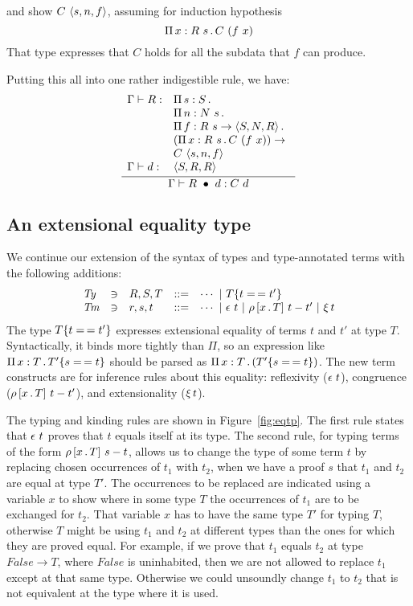 \documentclass{article}
\begin{document}
\noindent and show $C\ \ctor{s}{n}{f}$, assuming for induction hypothesis
\[
\Pia{x}{R\ s}{C\ (f\ x)}
\]
\noindent That type expresses that $C$ holds for all the subdata that $f$ can produce.

Putting this all into one rather indigestible rule, we have:
\[
\infer{\Gamma \vdash \wrec{R}{d} : C\ d}
      {
        \begin{array}{lll}
\Gamma \vdash R : & \Pia{s}{S}{\ }  \\
\ &  \Pia{n}{N\ s}{\ }  \\
\ &  \Pia{f}{R\ s \to \w{S}{N}{R}}{\ }  \\
\ &  (\Pia{x}{R\ s}{C\ (f\ x)}) \to  \\
\ &  C\ \ctor{s}{n}{f} \\
\Gamma\vdash d : & \w{S}{R}{R}
        \end{array} }
      \]



\subsection{An extensional equality type}

We continue our extension of the syntax of types and type-annotated terms with the following additions:
\[
\begin{array}{lllll}
  \textit{Ty} & \ni & R,S,T & ::= & \cdots\ |\ \eqtm{t}{T}{t'} \\
  \textit{Tm} & \ni & r,s,t & ::= & \cdots\ |\ \rfl{t}\ |\ \cng{x}{T}{t}{t'}\ |\ \ext{t}
\end{array}
\]
\noindent The type $\eqtm{t}{T}{t'}$ expresses extensional equality of
terms $t$ and $t'$ at type $T$.  Syntactically, it binds more tightly
than $\Pi$, so an expression like $\Pia{x}{T}{\eqtm{s}{T'}{t}}$ should
be parsed as $\Pia{x}{T}{(\eqtm{s}{T'}{t})}$.  The new term constructs
are for inference rules about this equality: reflexivity ($\rfl{t}$),
congruence ($\cng{x}{T}{t}{t'}$), and extensionality ($\ext{t}$).  

The typing and kinding rules are shown in
Figure~\ref{fig:eqtp}.  The first rule states that $\rfl{t}$ proves
that $t$ equals itself at its type.  The second rule, for typing
terms of the form $\cng{x}{T}{s}{t}$, allows us
to change the type of some term $t$ by replacing chosen occurrences
of $t_1$ with $t_2$, when we have a proof $s$ that $t_1$ and $t_2$
are equal at type $T'$.  The occurrences to be replaced are indicated
using a variable $x$ to show where in some type $T$ the occurrences
of $t_1$ are to be exchanged for $t_2$.  That variable $x$ has to
have the same type $T'$ for typing $T$, otherwise $T$ might be using
$t_1$ and $t_2$ at different types than the ones for which they are
proved equal.  For example, if we prove that $t_1$ equals $t_2$ at type
$\textit{False} \to T$, where $\textit{False}$ is uninhabited, then
we are not allowed to replace $t_1$ except at that same type.  Otherwise
we could unsoundly change $t_1$ to $t_2$ that is not equivalent at the
type where it is used.
\end{document}
